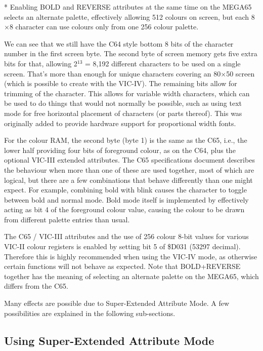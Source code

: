* Enabling BOLD and REVERSE attributes at the same time on the MEGA65 selects an alternate palette, effectively allowing 512 colours on screen, but each 8$\times$8 character can use colours only from one 256 colour palette.

We can see that we still have the C64 style bottom 8 bits of the character number in the first screen byte. The second byte of screen memory gets five extra bits for that, allowing 2$^{13}$ = 8,192 different characters to be used on a single screen. That's more than enough for unique characters covering an 80$\times$50 screen (which is possible to create with the VIC-IV).  The remaining bits allow for trimming of the character.  This allows for variable width characters, which can be used to do things that would not normally be possible, such as using text mode for free horizontal placement of characters (or parts thereof). This was originally added to provide hardware support for proportional width fonts.

For the colour RAM, the second byte (byte 1) is the same as the C65, i.e., the lower half providing four bits of foreground colour, as on the C64, plus the optional VIC-III extended attributes. The C65 specifications document describes the behaviour when more than one of these are used together, most of which are logical, but there are a few combinations that behave differently than one might expect. For example, combining bold with blink causes the character to toggle between bold and normal mode. Bold mode itself is implemented by effectively acting as bit 4 of the foreground colour value, causing the colour to be drawn from different palette entries than usual.

The C65 / VIC-III attributes and the use of 256 colour 8-bit values for various VIC-II colour registers is enabled by setting bit 5 of \$D031 (53297 decimal).  Therefore this is highly recommended when using the VIC-IV mode, as otherwise certain functions will not behave as expected. Note that BOLD+REVERSE together has the meaning of selecting an alternate palette on the MEGA65, which differs from the C65.

Many effects are possible due to Super-Extended Attribute Mode.  A few possibilities are explained in the following sub-sections.

\subsection{Using Super-Extended Attribute Mode}

